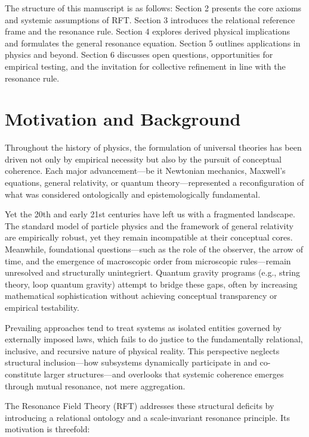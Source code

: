 \documentclass[12pt]{article}
\begin{document}
	The structure of this manuscript is as follows: Section 2 presents the core axioms and systemic assumptions of RFT. Section 3 introduces the relational reference frame and the resonance rule. Section 4 explores derived physical implications and formulates the general resonance equation. Section 5 outlines applications in physics and beyond. Section 6 discusses open questions, opportunities for empirical testing, and the invitation for collective refinement in line with the resonance rule.
	

	
	\section{Motivation and Background}
	
	Throughout the history of physics, the formulation of universal theories has been driven not only by empirical necessity but also by the pursuit of conceptual coherence. Each major advancement—be it Newtonian mechanics, Maxwell's equations, general relativity, or quantum theory—represented a reconfiguration of what was considered ontologically and epistemologically fundamental.
	
	Yet the 20th and early 21st centuries have left us with a fragmented landscape. The standard model of particle physics and the framework of general relativity are empirically robust, yet they remain incompatible at their conceptual cores. Meanwhile, foundational questions—such as the role of the observer, the arrow of time, and the emergence of macroscopic order from microscopic rules—remain unresolved and structurally unintegriert. Quantum gravity programs (e.g., string theory, loop quantum gravity) attempt to bridge these gaps, often by increasing mathematical sophistication without achieving conceptual transparency or empirical testability.
	
	Prevailing approaches tend to treat systems as isolated entities governed by externally imposed laws, which fails to do justice to the fundamentally relational, inclusive, and recursive nature of physical reality. This perspective neglects structural inclusion—how subsystems dynamically participate in and co-constitute larger structures—and overlooks that systemic coherence emerges through mutual resonance, not mere aggregation.
	
	The Resonance Field Theory (RFT) addresses these structural deficits by introducing a relational ontology and a scale-invariant resonance principle. Its motivation is threefold:
	
\end{document}
